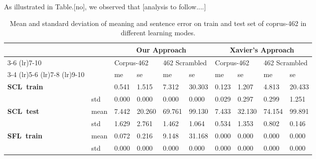 As illustrated in Table.[no], we observed that [analysis to follow....]

\begin{table}
\centering
\begin{threeparttable}
\caption{Mean and standard deviation of meaning and sentence error on train and test set of coprus-462 in different learning modes.}
\label{tab:corpus-structure}
\begin{tabular}{llllllllll}
  \toprule
  &  & \multicolumn{4}{c}{Our Approach} & \multicolumn{4}{c}{Xavier's Approach} \\
  \cmidrule(lr){3-6} \cmidrule(lr){7-10}
  
  \multirow{3}{*}{\raisebox{-\heavyrulewidth}{}} & \multirow{3}{*}{\raisebox{-\heavyrulewidth}{}} & \multicolumn{2}{l}{Corpus-462} & \multicolumn{2}{l}{462 Scrambled} & \multicolumn{2}{l}{Corpus-462} & \multicolumn{2}{l}{462 Scrambled} \\
  \cmidrule(lr){3-4} \cmidrule(lr){5-6} \cmidrule(lr){7-8} \cmidrule(lr){9-10}
  
  						& 		& me 	& se 		& me & se			& me 	& se 		& me 		& se \\
  \midrule
  \textbf{SCL\ train} 	& mean 	& 0.541 & 1.515 	& 7.312 & 30.303 	& 0.123 & 1.207 	& 4.813 & 20.433  \\
   			    		& std 	& 0.000 & 0.000 	& 0.000 & 0.000 	& 0.029 & 0.297 	& 0.299  & 1.251  \\
   			    		
  \textbf{SCL\ test} 	& mean  & 7.442 & 20.260 	& 69.761 & 99.130 	& 7.433 & 32.130 	& 74.154 & 99.891 \\
  			   			& std  	& 1.629 & 2.761 	& 1.462  & 1.064  	& 0.534 & 1.353 	& 0.802  & 0.146\\
  			   			
  \textbf{SFL\ train} 	& mean 	& 0.072 & 0.216 	& 9.148  & 31.168 	& 0.000 & 0.000 	& 0.000  & 0.000  \\
  				 		& std 	& 0.000 & 0.000 	& 0.000  & 0.000 	& 0.000 & 0.000 	& 0.000  & 0.000  \\
  				 		

\end{tabular}
\end{threeparttable}
\end{table}
